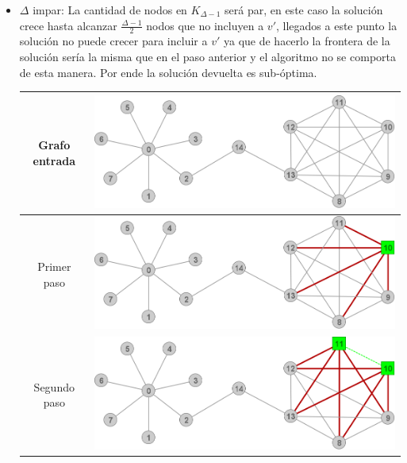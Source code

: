 \begin{itemize}
\begin{center}
\begin{tabular}{|c||c|}
	\end{tabular}
	\end{center}


	\item $\Delta$ impar: La cantidad de nodos en $K_{\Delta -1}$ ser\'a par, 
	en este caso la soluci\'on crece hasta alcanzar $\frac{\Delta -1}{2}$ nodos
	que no incluyen a $v'$, llegados a este punto la soluci\'on no puede crecer
	para incluir a $v'$ ya que de hacerlo la frontera de la soluci\'on ser\'ia
	la misma que en el paso anterior y el algoritmo no se comporta de esta manera.
	Por ende la soluci\'on devuelta es sub-\'optima.
	\begin{center}
	\begin{tabular}{|c||c|}
		\hline
		Grafo entrada & 
		\includegraphics[scale = 0.2]{img/ej3/busqueda_local/estrellaPuenteCMFPar.png} \\
		\hline
		Primer paso &
		\includegraphics[scale = 0.2]{img/ej3/busqueda_local/estrellaPuenteCMFPar_st01.png} \\
		\hline
		Segundo paso &
		\includegraphics[scale = 0.2]{img/ej3/busqueda_local/estrellaPuenteCMFPar_st02.png} \\

\end{tabular}
\end{center}
\end{itemize}
